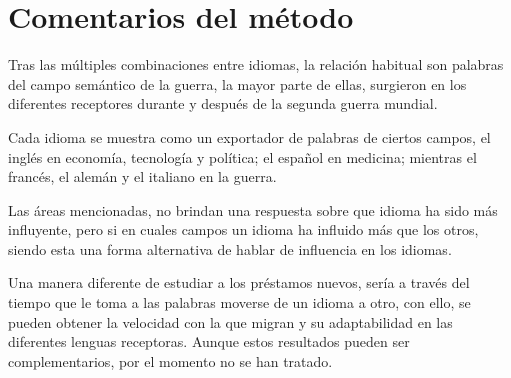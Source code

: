\section{Comentarios del método}%



Tras las múltiples combinaciones entre idiomas, la relación habitual son palabras del campo semántico de la guerra, la mayor parte de ellas, surgieron en los diferentes receptores durante y después de la segunda guerra mundial. 

Cada idioma se muestra como un exportador de palabras de ciertos campos,  el inglés en economía, tecnología y política; el español en medicina; mientras el francés, el alemán y el italiano en la guerra.  

Las áreas mencionadas, no brindan una respuesta sobre que idioma ha sido más influyente, pero si en cuales campos un idioma ha influido más que los otros, siendo esta una forma alternativa de hablar de influencia en los idiomas.
 
Una manera diferente de estudiar a los préstamos nuevos, sería a través del tiempo que le toma a las palabras moverse de un idioma a otro, con ello, se pueden obtener la velocidad con la que migran y su adaptabilidad en las diferentes lenguas receptoras. Aunque estos resultados pueden ser complementarios, por el momento no se han tratado. 



















